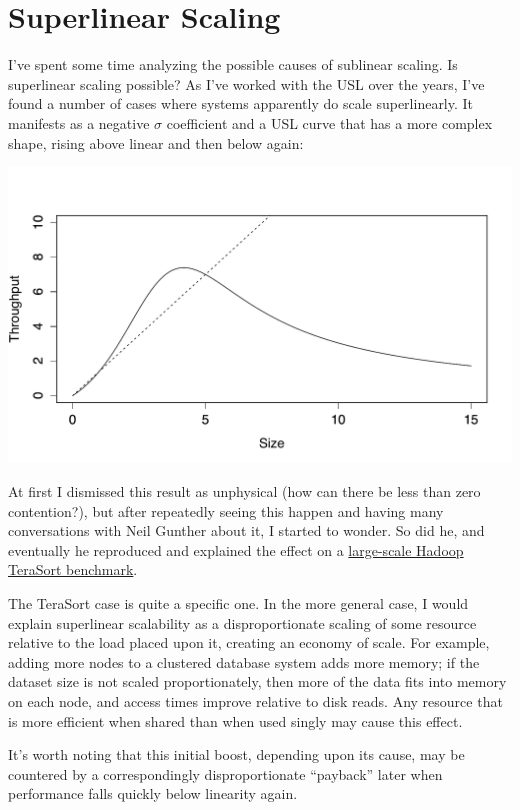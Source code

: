 \documentclass{vivid_layout}
\begin{document}
\newpage
\section{Superlinear Scaling}

I've spent some time analyzing the possible causes of sublinear scaling. Is
superlinear scaling possible? As I've worked with the USL over the years, I've
found a number of cases where systems apparently do scale superlinearly. It
manifests as a negative $\sigma$ coefficient and a USL curve that has a more
complex shape, rising above linear and then below again:
\begin{center}
\includegraphics[width=.85\linewidth]{scalability/superlinear}
\end{center}

At first I dismissed this result as unphysical (how can there be less than zero
contention?), but after repeatedly seeing this happen and having many
conversations with Neil Gunther about it, I started to wonder. So did he, and
eventually he reproduced and explained the effect on a
\href{https://queue.acm.org/detail.cfm?id=2789974}{large-scale Hadoop TeraSort
benchmark}.

The TeraSort case is quite a specific one. In the more general case, I would
explain superlinear scalability as a disproportionate scaling of some resource
relative to the load placed upon it, creating an economy of scale. For example,
adding more nodes to a clustered database system adds more memory; if the
dataset size is not scaled proportionately, then more of the data fits into
memory on each node, and access times improve relative to disk reads. Any
resource that is more efficient when shared than when used singly may cause this
effect.

It's worth noting that this initial boost, depending upon its cause, may be
countered by a correspondingly disproportionate ``payback'' later when
performance falls quickly below linearity again.
\end{document}
